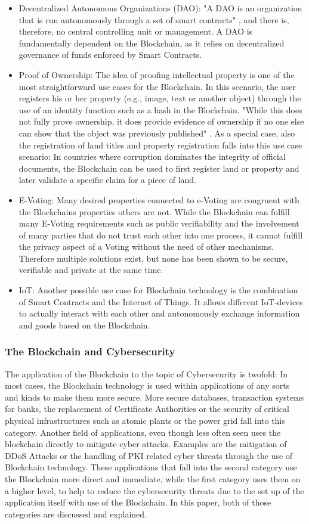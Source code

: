 \begin{itemize}
  \item Decentralized Autonomous Organizations (DAO): "A DAO is an organization that is run autonomously through a set of smart contracts" \cite{Wust2017}, and there is, therefore, no central controlling unit or management. A DAO is fundamentally dependent on the Blockchain, as it relies on decentralized governance of funds enforced by Smart Contracts.
  \item Proof of Ownership: The idea of proofing intellectual property is one of the most straightforward use cases for the Blockchain. In this scenario, the user registers his or her property (e.g., image, text or another object) through the use of an identity function such as a hash in the Blockchain. "While this does not fully prove ownership, it does provide evidence of ownership if no one else can show that the object was previously published" \cite{Wust2017}. As a special case, also the registration of land titles and property registration falls into this use case scenario: In countries where corruption dominates the integrity of official documents, the Blockchain can be used to first register land or property and later validate a specific claim for a piece of land.
  \item E-Voting: Many desired properties connected to e-Voting are congruent with the Blockchains properties others are not. While the Blockchain can fulfill many E-Voting requirements such as public verifiability and the involvement of many parties that do not trust each other into one process, it cannot fulfill the privacy aspect of a Voting without the need of other mechanisms. Therefore multiple solutions exist, but none has been shown to be secure, verifiable and private at the same time.
  \item IoT: Another possible use case for Blockchain technology is the combination of Smart Contracts and the Internet of Things. It allows different IoT-devices to actually interact with each other and autonomously exchange information and goods based on the Blockchain.
\end{itemize}
\subsubsection{The Blockchain and Cybersecurity}
The application of the Blockchain to the topic of Cybersecurity is twofold: In most cases, the Blockchain technology is used within applications of any sorts and kinds to make them more secure. More secure databases, transaction systems for banks, the replacement of Certificate Authorities or the security of critical physical infrastructures such as atomic plants or the power grid fall into this category. Another field of applications, even though less often seen uses the blockchain directly to mitigate cyber attacks. Examples are the mitigation of DDoS Attacks or the handling of PKI related cyber threats through the use of Blockchain technology. These applications that fall into the second category use the Blockchain more direct and immediate, while the first category uses them on a higher level, to help to reduce the cybersecurity threats due to the set up of the application itself with use of the Blockchain.
In this paper, both of those categories are discussed and explained.
